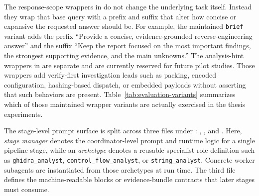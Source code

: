 The response-scope wrappers in  do not change the underlying task itself. Instead they wrap that base query with a prefix and suffix that alter how concise or expansive the requested answer should be. For example, the maintained \texttt{brief} variant adds the prefix ``Provide a concise, evidence-grounded reverse-engineering answer'' and the suffix ``Keep the report focused on the most important findings, the strongest supporting evidence, and the main unknowns.'' The analysis-hint wrappers in  are separate and are currently reserved for future pilot studies. Those wrappers add verify-first investigation leads such as packing, encoded configuration, hashing-based dispatch, or embedded payloads without asserting that such behaviors are present. Table~\ref{tab:evaluation-variants} summarizes which of those maintained wrapper variants are actually exercised in the thesis experiments.

The stage-level prompt surface is split across three files under : , , and . Here, \emph{stage manager} denotes the coordinator-level prompt and runtime logic for a single pipeline stage, while an \emph{archetype} denotes a reusable specialist role definition such as \texttt{ghidra\_analyst}, \texttt{control\_flow\_analyst}, or \texttt{string\_analyst}. Concrete worker subagents are instantiated from those archetypes at run time. The third file defines the machine-readable blocks or evidence-bundle contracts that later stages must consume.

